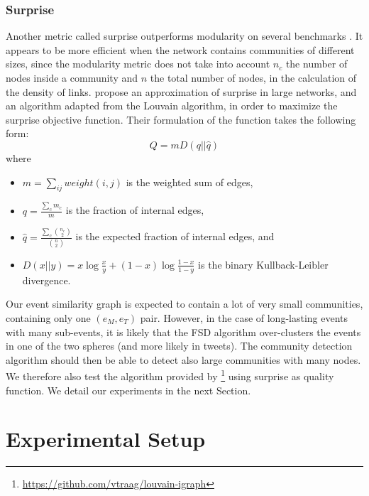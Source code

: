 \subsubsection{Surprise}
Another metric called surprise outperforms modularity on several benchmarks  \citep{aldecoa_deciphering_2011}. It appears to be more efficient when the network contains communities of different sizes, since the modularity metric does not take into account $n_c$ the number of nodes inside a community and $n$ the total number of nodes, in the calculation of the density of links. \cite{traag2015detecting} propose an approximation of surprise in large networks, and an algorithm adapted from the Louvain algorithm, in order to maximize the surprise objective function. Their formulation of the function takes the following form:
\begin{equation}
    Q=mD(q || \hat{q})
\end{equation}
where
\begin{itemize}
    \item $m= \sum\limits_{ij} weight(i,j)$ is the weighted sum of edges,
    \item $q = \frac{\sum\limits_{c}m_c}{m}$ is the fraction of internal edges,
    \item $\hat{q} = \frac{\sum\limits_{c}\binom{n_c}{2}}{\binom{n}{2}}$ is the expected fraction of internal edges, and
    \item $D(x||y) = x \log \frac{x}{y} + (1 - x) \log \frac{1-x}{1-y}$ is the binary Kullback-Leibler divergence.
\end{itemize}
Our event similarity graph is expected to contain a lot of very small communities, containing only one $(e_M, e_T)$ pair. However, in the case of long-lasting events with many sub-events, it is likely that the FSD algorithm over-clusters the events in one of the two spheres (and more likely in tweets). The community detection algorithm should then be able to detect also large communities with many nodes. We therefore also test the algorithm provided by \cite{traag2015detecting}\footnote{\url{https://github.com/vtraag/louvain-igraph}} using surprise as quality function. We detail our experiments in the next Section.

\section{Experimental Setup}
